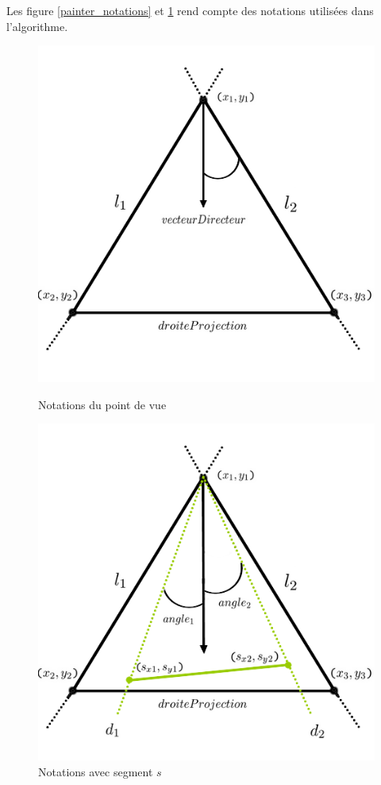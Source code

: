 \documentclass[11pt,a4paper]{article}
\begin{document}
Les figure \ref{painter_notations} et \ref{painter_notations_2} rend compte des notations utilisées dans l'algorithme.
\\
\begin{figure}[!htbp]
  \centering
  \begin{minipage}[b]{0.4\textwidth}
    \includegraphics[width=\textwidth]{painter_notations.png}
    \caption{Notations du point de vue}
		\label{painter_notations}
  \end{minipage}
  \hfill
  \begin{minipage}[b]{0.4\textwidth}
    \includegraphics[width=\textwidth]{painter_notations_2.png}
    \caption{Notations avec segment $s$}
		\label{painter_notations_2}
  \end{minipage}
\end{figure}
\\
\end{document}
